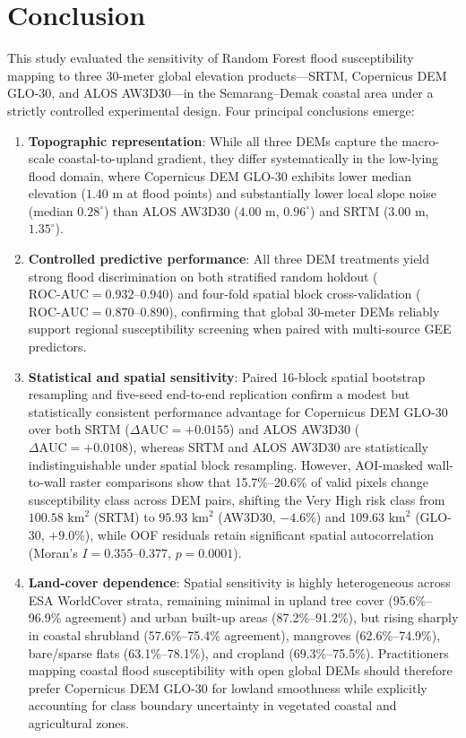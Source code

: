 \documentclass[11pt,twoside]{article}
\begin{document}
\section{Conclusion}\label{sec:conclusion}

This study evaluated the sensitivity of Random Forest flood susceptibility mapping to three 30-meter global elevation products---SRTM, Copernicus DEM GLO-30, and ALOS AW3D30---in the Semarang--Demak coastal area under a strictly controlled experimental design. Four principal conclusions emerge:
\begin{enumerate}
\item \textbf{Topographic representation}: While all three DEMs capture the macro-scale coastal-to-upland gradient, they differ systematically in the low-lying flood domain, where Copernicus DEM GLO-30 exhibits lower median elevation ($1.40\text{ m}$ at flood points) and substantially lower local slope noise (median $0.28^\circ$) than ALOS AW3D30 ($4.00\text{ m}$, $0.96^\circ$) and SRTM ($3.00\text{ m}$, $1.35^\circ$).
\item \textbf{Controlled predictive performance}: All three DEM treatments yield strong flood discrimination on both stratified random holdout ($\text{ROC-AUC} = 0.932\text{--}0.940$) and four-fold spatial block cross-validation ($\text{ROC-AUC} = 0.870\text{--}0.890$), confirming that global 30-meter DEMs reliably support regional susceptibility screening when paired with multi-source GEE predictors.
\item \textbf{Statistical and spatial sensitivity}: Paired 16-block spatial bootstrap resampling and five-seed end-to-end replication confirm a modest but statistically consistent performance advantage for Copernicus DEM GLO-30 over both SRTM ($\Delta\text{AUC} = +0.0155$) and ALOS AW3D30 ($\Delta\text{AUC} = +0.0108$), whereas SRTM and ALOS AW3D30 are statistically indistinguishable under spatial block resampling. However, AOI-masked wall-to-wall raster comparisons show that 15.7\%--20.6\% of valid pixels change susceptibility class across DEM pairs, shifting the Very High risk class from $100.58\text{ km}^2$ (SRTM) to $95.93\text{ km}^2$ (AW3D30, $-4.6\%$) and $109.63\text{ km}^2$ (GLO-30, $+9.0\%$), while OOF residuals retain significant spatial autocorrelation (Moran's $I = 0.355\text{--}0.377$, $p = 0.0001$).
\item \textbf{Land-cover dependence}: Spatial sensitivity is highly heterogeneous across ESA WorldCover strata, remaining minimal in upland tree cover (95.6\%--96.9\% agreement) and urban built-up areas (87.2\%--91.2\%), but rising sharply in coastal shrubland (57.6\%--75.4\% agreement), mangroves (62.6\%--74.9\%), bare/sparse flats (63.1\%--78.1\%), and cropland (69.3\%--75.5\%). Practitioners mapping coastal flood susceptibility with open global DEMs should therefore prefer Copernicus DEM GLO-30 for lowland smoothness while explicitly accounting for class boundary uncertainty in vegetated coastal and agricultural zones.
\end{enumerate}
\end{document}
